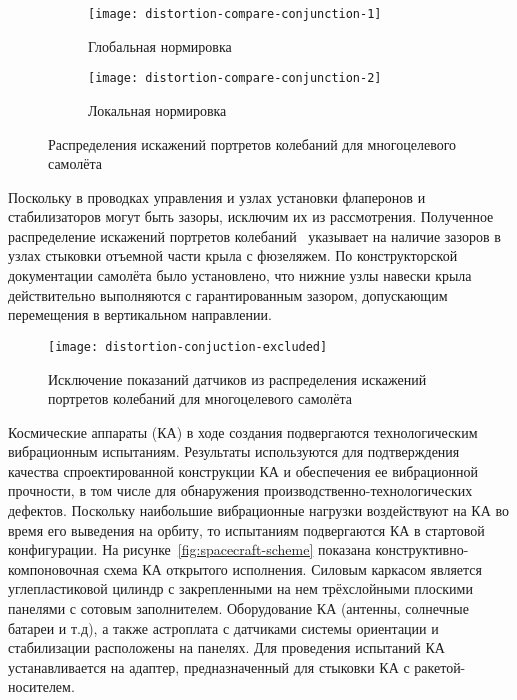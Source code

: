 \begin{figure}[!htb]
	\centerfloat
	\begin{subfigure}[t]{\sfDefects}
		\texttt{[image: distortion-compare-conjunction-1]} 
		\caption{Глобальная нормировка} \label{subfig:distortion-compare-conjunction-1}
	\end{subfigure}
	\hfill
	\begin{subfigure}[t]{\sfDefects}
		\texttt{[image: distortion-compare-conjunction-2]} 
		\caption{Локальная нормировка} \label{subfig:distortion-compare-conjunction-2}
	\end{subfigure}
    \caption{Распределения искажений портретов колебаний для многоцелевого самолёта} \label{fig:distortion-compare-conjunction}
\end{figure}

Поскольку в проводках управления и узлах установки флаперонов и стабилизаторов могут быть зазоры, исключим их из рассмотрения. Полученное распределение искажений портретов колебаний~ указывает на наличие зазоров в узлах стыковки отъемной части крыла с фюзеляжем. По конструкторской документации самолёта было установлено, что нижние узлы навески крыла действительно выполняются с гарантированным зазором, допускающим перемещения в вертикальном направлении.

\begin{figure}[!htb]
	\centerfloat
	\texttt{[image: distortion-conjuction-excluded]}
	\caption{Исключение показаний датчиков из распределения искажений портретов колебаний для многоцелевого самолёта} \label{fig:distortion-conjunction-excluded}
\end{figure}

Космические аппараты (КА) в ходе создания подвергаются технологическим вибрационным испытаниям. Результаты используются для подтверждения качества спроектированной конструкции КА и обеспечения ее вибрационной прочности, в том числе для обнаружения производственно-технологических дефектов. Поскольку наибольшие вибрационные нагрузки воздействуют на КА во время его выведения на орбиту, то испытаниям подвергаются КА в стартовой конфигурации. На рисунке~\ref{fig:spacecraft-scheme} показана конструктивно-компоновочная схема КА открытого исполнения. Силовым каркасом является углепластиковой цилиндр с закрепленными на нем трёхслойными плоскими панелями с сотовым заполнителем. Оборудование КА (антенны, солнечные батареи и т.д), а также астроплата с датчиками системы ориентации и стабилизации расположены на панелях. Для проведения испытаний КА устанавливается на адаптер, предназначенный для стыковки КА с ракетой-носителем.

